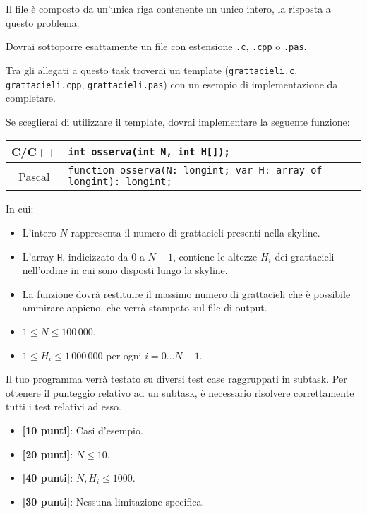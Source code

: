 \OutputFile
Il file \outputfile{} è composto da un'unica riga contenente un unico intero, la risposta a questo problema.

\Implementation
Dovrai sottoporre esattamente un file con estensione \texttt{.c}, \texttt{.cpp} o \texttt{.pas}.

\begin{warning}
Tra gli allegati a questo task troverai un template (\texttt{grattacieli.c}, \texttt{grattacieli.cpp}, \texttt{grattacieli.pas}) con un esempio di implementazione da completare.
\end{warning}

Se sceglierai di utilizzare il template, dovrai implementare la seguente funzione:
\begin{center}\begin{tabularx}{\textwidth}{|c|X|}
\hline
C/C++  & \verb|int osserva(int N, int H[]);|\\
\hline
Pascal & \verb|function osserva(N: longint; var H: array of longint): longint;|\\
\hline
\end{tabularx}\end{center}
In cui:
\begin{itemize}[nolistsep]
  \item L'intero $N$ rappresenta il numero di grattacieli presenti nella skyline.
  \item L'array \texttt{H}, indicizzato da $0$ a $N-1$, contiene le altezze $H_i$ dei grattacieli nell'ordine in cui sono disposti lungo la skyline.
  \item La funzione dovrà restituire il massimo numero di grattacieli che è possibile ammirare appieno, che verrà stampato sul file di output.
\end{itemize}

\Constraints
\begin{itemize}[nolistsep, itemsep=2mm]
\item $1 \le N \le 100\,000$.
\item $1 \le H_i \le  1\,000\,000$ per ogni $i=0\ldots N-1$.
\end{itemize}

\Scoring
Il tuo programma verrà testato su diversi test case raggruppati in subtask.
Per ottenere il punteggio relativo ad un subtask, è necessario risolvere
correttamente tutti i test relativi ad esso.

\begin{itemize}[nolistsep,itemsep=2mm]
  \item \textbf{ [10 punti]}: Casi d'esempio.
  \item \textbf{ [20 punti]}: $N \leq 10$.
  \item \textbf{ [40 punti]}: $N, H_i \leq 1000$.
  \item \textbf{ [30 punti]}: Nessuna limitazione specifica.
\end{itemize}

